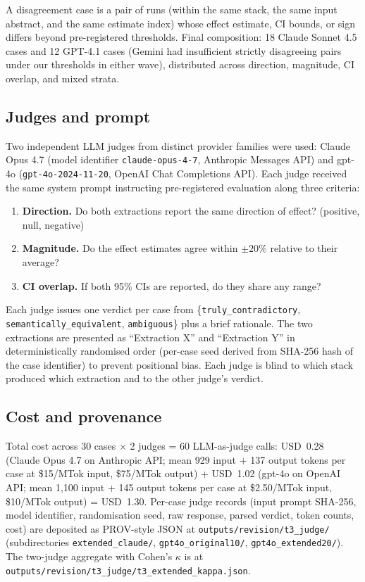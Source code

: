 \documentclass[11pt]{article}
\begin{document}
A disagreement case is a pair of runs (within the same stack, the same input abstract, and the same estimate index) whose effect estimate, CI bounds, or sign differs beyond pre-registered thresholds. Final composition: 18 Claude Sonnet 4.5 cases and 12 GPT-4.1 cases (Gemini had insufficient strictly disagreeing pairs under our thresholds in either wave), distributed across direction, magnitude, CI overlap, and mixed strata.

\subsection{Judges and prompt}

Two independent LLM judges from distinct provider families were used: Claude Opus 4.7 (model identifier \texttt{claude-opus-4-7}, Anthropic Messages API) and gpt-4o (\texttt{gpt-4o-2024-11-20}, OpenAI Chat Completions API). Each judge received the same system prompt instructing pre-registered evaluation along three criteria:

\begin{enumerate}[leftmargin=*]
    \item \textbf{Direction.} Do both extractions report the same direction of effect? (positive, null, negative)
    \item \textbf{Magnitude.} Do the effect estimates agree within $\pm 20\%$ relative to their average?
    \item \textbf{CI overlap.} If both 95\% CIs are reported, do they share any range?
\end{enumerate}

Each judge issues one verdict per case from \{\texttt{truly\_contradictory}, \texttt{semantically\_equivalent}, \texttt{ambiguous}\} plus a brief rationale. The two extractions are presented as ``Extraction X'' and ``Extraction Y'' in deterministically randomised order (per-case seed derived from SHA-256 hash of the case identifier) to prevent positional bias. Each judge is blind to which stack produced which extraction and to the other judge's verdict.

\subsection{Cost and provenance}

Total cost across 30 cases $\times$ 2 judges = 60 LLM-as-judge calls: USD~0.28 (Claude Opus 4.7 on Anthropic API; mean 929 input + 137 output tokens per case at \$15/MTok input, \$75/MTok output) + USD~1.02 (gpt-4o on OpenAI API; mean 1{,}100 input + 145 output tokens per case at \$2.50/MTok input, \$10/MTok output) = USD~1.30. Per-case judge records (input prompt SHA-256, model identifier, randomisation seed, raw response, parsed verdict, token counts, cost) are deposited as PROV-style JSON at \texttt{outputs/revision/t3\_judge/} (subdirectories \texttt{extended\_claude/}, \texttt{gpt4o\_original10/}, \texttt{gpt4o\_extended20/}). The two-judge aggregate with Cohen's $\kappa$ is at \texttt{outputs/revision/t3\_judge/t3\_extended\_kappa.json}.
\end{document}
